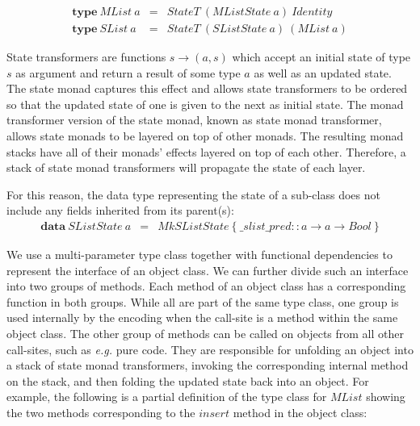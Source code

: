 \documentclass[runningheads,a4paper]{llncs}
\begin{document}
\begin{displaymath}
\begin{array}{lcl}
\mathbf{type}~\mathit{MList}~a & = & \mathit{StateT}~(\mathit{MListState}~a)~\mathit{Identity} \\
\mathbf{type}~\mathit{SList}~a & = & \mathit{StateT}~(\mathit{SListState}~a)~(\mathit{MList}~a)
\end{array}
\end{displaymath}

State transformers are functions $s \to (a,s)$ which accept an initial state of type $s$ as argument and return a result of some type $a$ as well as an updated state. The state monad captures this effect and allows state transformers to be ordered so that the updated state of one is given to the next as initial state. The monad transformer version of the state monad, known as state monad transformer, allows state monads to be layered on top of other monads. The resulting monad stacks have all of their monads' effects layered on top of each other. Therefore, a stack of state monad transformers will propagate the state of each layer.

For this reason, the data type representing the state of a sub-class does not include any fields inherited from its parent(s):
\begin{displaymath}
\begin{array}{lcl}
\mathbf{data}~\mathit{SListState}~a & = & \mathit{MkSListState}~\{~ \_ slist \_ pred :: a \to a \to \mathit{Bool}~\}
\end{array}
\end{displaymath}

We use a multi-parameter type class together with functional dependencies \cite{jones2000type} to represent the interface of an object class. We can further divide such an interface into two groups of methods. Each method of an object class has a corresponding function in both groups. While all are part of the same type class, one group is used internally by the encoding when the call-site is a method within the same object class. The other group of methods can be called on objects from all other call-sites, such as \emph{e.g.} pure code. They are responsible for unfolding an object into a stack of state monad transformers, invoking the corresponding internal method on the stack, and then folding the updated state back into an object. For example, the following is a partial definition of the type class for $\mathit{MList}$ showing the two methods corresponding to the $\mathit{insert}$ method in the object class:
 
\end{document}
